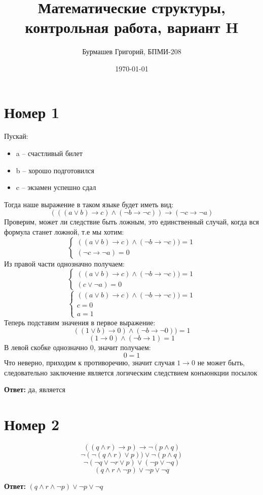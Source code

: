 \documentclass[a4paper,12pt]{article}
\author{Бурмашев Григорий, БПМИ-208}
\title{Математические структуры, контрольная работа, вариант H}
\date{\today}
\begin{document}
\maketitle
\clearpage
\section*{Номер 1}
Пускай:
\begin{itemize}
\item a -- счастливый билет
\item b -- хорошо подготовился
\item c -- экзамен успешно сдал
\end{itemize}
Тогда наше выражение в таком языке будет иметь вид:
\[
(((a \vee b) \rightarrow c) \wedge (\neg b \rightarrow \neg c)) \rightarrow (\neg c \rightarrow \neg a)
\]
Проверим, может ли следствие быть ложным, это единственный случай, когда вся формула станет ложной, т.е мы хотим:
\[
\begin{cases}
((a \vee b) \rightarrow c) \wedge (\neg b \rightarrow \neg c)) = 1 \\
 (\neg c \rightarrow \neg a)  = 0 
\end{cases}
\]
Из правой части однозначно получаем:
\[
\begin{cases}
((a \vee b) \rightarrow c) \wedge (\neg b \rightarrow \neg c)) = 1\\
 ( c \vee \neg a)  = 0 
\end{cases}
\]
\[
\begin{cases}
((a \vee b) \rightarrow c) \wedge (\neg b \rightarrow \neg c)) = 1\\
c = 0 \\ 
a = 1
\end{cases}
\]
Теперь подставим значения в первое выражение:
\[
((1 \vee b) \rightarrow 0) \wedge (\neg b \rightarrow \neg 0)) = 1
\]
\[
(1 \rightarrow 0) \wedge (\neg b \rightarrow 1) = 1
\]
В левой	 скобке однозначно 0, значит получаем:
\[
0 = 1
\]
Что неверно, приходим к противоречию, значит случая $1 \rightarrow 0$ не может быть, следовательно заключение является логическим следствием конъюнкции посылок
\begin{center}
\textbf{Ответ: } да, является
\end{center}
\section*{Номер 2}
\[
((q \wedge r) \rightarrow p) \rightarrow \neg (p \wedge q) 
\]
\[
\neg  (\neg (q \wedge r) \vee p)) \vee \neg (p \wedge q) 
\]
\[
\neg (\neg  q \vee \neg r \vee p) \vee (\neg p \vee \neg q)
\]
\[
(q \wedge r \wedge \neg p) \vee \neg p \vee \neg q
\]
\begin{center}
\textbf{Ответ: } $(q \wedge r \wedge \neg p) \vee \neg p \vee \neg q$
\end{center}
\clearpage
\end{document}
